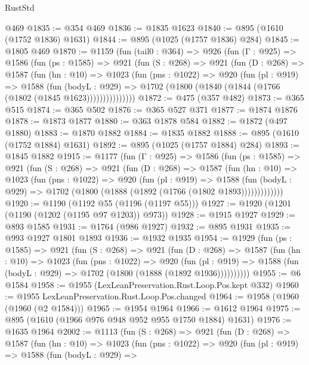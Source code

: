 \begin{lexlean}{RustStd}
\begin{coremodule}
{\begin{coremodule}
{{{{{{{{{    @469
@1835 := @354 @469
@1836 := @1835 @1623
@1840 := @895 (@1610 (@1752 @1836) @1631)
@1844 := @895 (@1025 (@1757 @1836) @284)
@1845 := @1805 @469
@1870 := @1159
    (fun (tail0 : @364) =>
    @926
      (fun (Γ : @925) =>
      @1586
        (fun (ps : @1585) =>
        @921
          (fun (S : @268) =>
          @921
            (fun (D : @268) =>
            @1587
              (fun (hn : @10) =>
              @1023
                (fun (pns : @1022) =>
                @920
                  (fun (pl : @919) =>
                  @1588
                    (fun (bodyL : @929) =>
                    @1702 (@1800 (@1840 (@1844 (@1766 (@1802 (@1845 @1623)))))))))))))))
@1872 := @475 (@357 @482)
@1873 := @365 @515
@1874 := @365 @502
@1876 := @365 @527 @371
@1877 := @1874 @1876
@1878 := @1873 @1877
@1880 := @363 @1878 @584
@1882 := @1872 (@497 @1880)
@1883 := @1870 @1882
@1884 := @1835 @1882
@1888 := @895 (@1610 (@1752 @1884) @1631)
@1892 := @895 (@1025 (@1757 @1884) @284)
@1893 := @1845 @1882
@1915 := @1177
    (fun (Γ : @925) =>
    @1586
      (fun (ps : @1585) =>
      @921
        (fun (S : @268) =>
        @921
          (fun (D : @268) =>
          @1587
            (fun (hn : @10) =>
            @1023
              (fun (pns : @1022) =>
              @920
                (fun (pl : @919) =>
                @1588
                  (fun (bodyL : @929) => @1702 (@1800 (@1888 (@1892 (@1766 (@1802 @1893)))))))))))))
@1920 := @1190 (@1192 @55 (@1196 (@1197 @55)))
@1927 := @1920 (@1201 (@1190 (@1202 (@1195 @97 @1203)) @973))
@1928 := @1915 @1927
@1929 := @893 @1585
@1931 := @1764 (@986 @1927)
@1932 := @895 @1931
@1935 := @993 @1927 @1801 @1893
@1936 := @1932 @1935
@1954 := @1929
    (fun (ps : @1585) =>
    @921
      (fun (S : @268) =>
      @921
        (fun (D : @268) =>
        @1587
          (fun (hn : @10) =>
          @1023
            (fun (pns : @1022) =>
            @920
              (fun (pl : @919) =>
              @1588 (fun (bodyL : @929) => @1702 (@1800 (@1888 (@1892 @1936))))))))))
@1955 := @6 @1584
@1958 := @1955 (LexLeanPreservation.Rust.Loop.Pos.kept @332)
@1960 := @1955 LexLeanPreservation.Rust.Loop.Pos.changed
@1964 := @1958 (@1960 (@1960 (@2 @1584)))
@1965 := @1954 @1964
@1966 := @1612 @1964
@1975 := @895 (@1610 (@1966 @976 @948 @952 @955 @1750 @1884) @1631)
@1976 := @1635 @1964
@2002 := @1113
    (fun (S : @268) =>
    @921
      (fun (D : @268) =>
      @1587
        (fun (hn : @10) =>
        @1023
          (fun (pns : @1022) =>
          @920
            (fun (pl : @919) =>
            @1588
              (fun (bodyL : @929) =>
}}}}}}}}}
\end{coremodule}}
\end{coremodule}
\end{lexlean}
